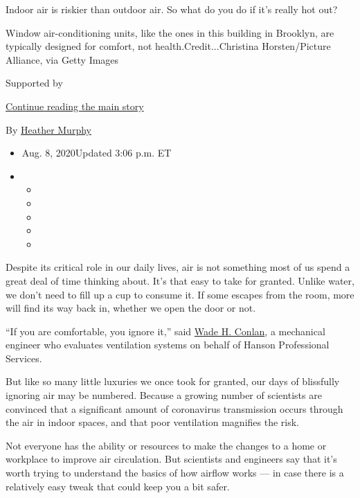 Indoor air is riskier than outdoor air. So what do you do if it's really
hot out?

Window air-conditioning units, like the ones in this building in
Brooklyn, are typically designed for comfort, not
health.Credit...Christina Horsten/Picture Alliance, via Getty Images

Supported by

\protect\hyperlink{after-sponsor}{Continue reading the main story}

By \href{https://www.nytimes.com/by/heather-murphy}{Heather Murphy}

\begin{itemize}
\item
  Aug. 8, 2020Updated 3:06 p.m. ET
\item
  \begin{itemize}
  \item
  \item
  \item
  \item
  \item
  \end{itemize}
\end{itemize}

Despite its critical role in our daily lives, air is not something most
of us spend a great deal of time thinking about. It's that easy to take
for granted. Unlike water, we don't need to fill up a cup to consume it.
If some escapes from the room, more will find its way back in, whether
we open the door or not.

``If you are comfortable, you ignore it,'' said
\href{https://www.ashrae.org/professional-development/learning-portal/instructor-led-training/ashrae-instructors/wade-h-conlan}{Wade
H. Conlan}, a mechanical engineer who evaluates ventilation systems on
behalf of Hanson Professional Services.

But like so many little luxuries we once took for granted, our days of
blissfully ignoring air may be numbered. Because a growing number of
scientists are convinced that a significant amount of coronavirus
transmission occurs through the air in indoor spaces, and that poor
ventilation magnifies the risk.

Not everyone has the ability or resources to make the changes to a home
or workplace to improve air circulation. But scientists and engineers
say that it's worth trying to understand the basics of how airflow works
--- in case there is a relatively easy tweak that could keep you a bit
safer.

